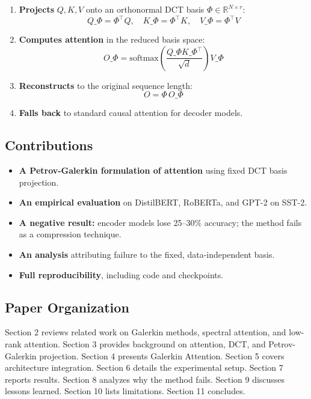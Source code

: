 \begin{enumerate}
\item \textbf{Projects} $Q, K, V$ onto an orthonormal DCT basis $\Phi \in \mathbb{R}^{N \times r}$:
  $$
  Q\_\Phi = \Phi^\top Q, \quad K\_\Phi = \Phi^\top K, \quad V\_\Phi = \Phi^\top V
  $$

\item \textbf{Computes attention} in the reduced basis space:
  $$
  O\_\Phi = \mathrm{softmax}\!\left(\frac{Q\_\Phi K\_\Phi^\top}{\sqrt{d}}\right) V\_\Phi
  $$

\item \textbf{Reconstructs} to the original sequence length:
  $$
  O = \Phi \, O\_\Phi
  $$

\item \textbf{Falls back} to standard causal attention for decoder models.

\end{enumerate}
\subsection{Contributions}

\begin{itemize}
\item \textbf{A Petrov-Galerkin formulation of attention} using fixed DCT basis
  projection.
\item \textbf{An empirical evaluation} on DistilBERT, RoBERTa, and GPT-2 on SST-2.
\item \textbf{A negative result:} encoder models lose 25--30\% accuracy; the method
  fails as a compression technique.
\item \textbf{An analysis} attributing failure to the fixed, data-independent basis.
\item \textbf{Full reproducibility}, including code and checkpoints.

\end{itemize}
\subsection{Paper Organization}

Section 2 reviews related work on Galerkin methods, spectral attention, 
and low-rank attention. Section 3 provides background on attention, DCT, 
and Petrov-Galerkin projection. Section 4 presents Galerkin Attention. 
Section 5 covers architecture integration. Section 6 details the 
experimental setup. Section 7 reports results. Section 8 analyzes why the 
method fails. Section 9 discusses lessons learned. Section 10 lists 
limitations. Section 11 concludes.



